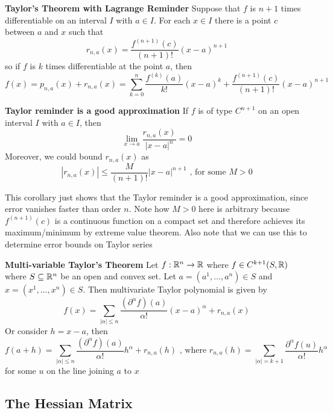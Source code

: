 \documentclass[11pt]{article}
\begin{document}
\begin{theorem}
  \label{Taylor's Theorem with Lagrange Reminder} \textbf{Taylor's Theorem with Lagrange Reminder} Suppose that $f$ is $n+1$ times differentiable on an interval $I$ with $a\in I$. For each $x\in I$ there is a point $c$ between $a$ and $x$ such that
  \[
    r_{n,a}(x) = \frac{f^{(n+1)}(c)}{(n+1)!} (x-a)^{n+1}
  \]
  so if $f$ is $k$ times differentiable at the point $a$, then
  \[
    f(x) = p_{n, a}(x) + r_{n, a}(x) = \sum_{k=0}^{n} \frac{f^{(k)}(a)}{k!} (x-a)^k + \frac{f^{(n+1)}(c)}{(n+1)!} (x-a)^{n+1}
  \]
\end{theorem}

\begin{corollary}
  \textbf{Taylor reminder is a good approximation} If $f$ is of type $C^{n+1}$ on an open interval $I$ with $a\in I$, then
  \[
  \lim_{x\to a} \frac{r_{n, a}(x)}{| x-a |^n} = 0
  \]
  Moreover, we could bound $r_{n, a}(x)$ as
  \[
    | r_{n,a}(x) | \leq \frac{M}{(n+1)!} | x-a |^{n+1} \text{ , for some } M>0
  \]
  \begin{rem}
    This corollary just shows that the Taylor reminder is a good approximation, since error vanishes faster than order $n$. Note how $M>0$ here is arbitrary because $f^{(n+1)}(c)$ is a continuous function on a compact set and therefore achieves its maximum/minimum by extreme value theorem. Also note that we can use this to determine error bounds on Taylor series
  \end{rem}

\end{corollary}


\begin{theorem}
  \label{Multi-variable Taylor's Theorem} \textbf{Multi-variable Taylor's Theorem} Let $f:\mathbb{R}^n \rightarrow \mathbb{R}$ where $f\in C^{k+1}(S, \mathbb{R})$ where $S\subseteq \mathbb{R}^n$ be an open and convex set. Let $a = (a^1, \dots, a^n)\in S$ and $x = (x^1,\dots, x^n) \in S$. Then multivariate Taylor polynomial is given by
  \[
    f(x) = \sum_{|\alpha|\leq n} \frac{( \partial^{\alpha} f ) (a)}{\alpha !} (x-a)^{\alpha} + r_{n,a} (x)
  \]
  Or consider $h = x - a$, then
  \[
    f(a+h) = \sum_{|\alpha|\leq n} \frac{( \partial^{\alpha} f ) (a)}{\alpha !} h^{\alpha} + r_{n,a} (h) \text{ , where } r_{n, a} (h) = \sum_{|\alpha| = k+1} \frac{\partial^{\alpha} f(u)}{\alpha !} h^{\alpha}
  \]
  for some $u$ on the line joining $a$ to $x$
\end{theorem}


\subsection{The Hessian Matrix}
\end{document}
